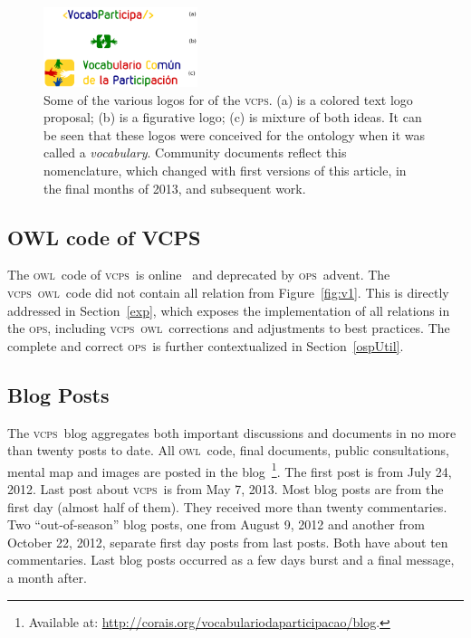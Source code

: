 \documentclass[10pt,letterpaper]{article}
\newcommand{\ops}{\textsc{ops}}
\newcommand{\vcps}{\textsc{vcps}}
\newcommand{\owl}{\textsc{owl}}
\begin{document}
\begin{figure}[!h]
    \centering
    \includegraphics[width=0.4\textwidth]{figs/logoUnificadoDoPDF}
    \caption{Some of the various logos for of the \vcps.
    (a) is a colored text logo proposal; (b) is a figurative logo; (c) is mixture of both ideas.
    It can be seen that these logos were conceived for the ontology when it was called a \emph{vocabulary}.
    Community documents reflect this nomenclature, which changed with first versions of this article,
    in the final months of 2013, and subsequent work.}
    \label{logo}
\end{figure}

\subsection{OWL code of VCPS}\label{owl}
The \owl\ code of \vcps\ is online~\cite{owlVcps} and deprecated by \ops\ advent. 
The \vcps\ \owl\ code did not contain all relation from Figure~\ref{fig:v1}.
This is directly addressed in Section~\ref{exp},
which exposes the implementation of all relations in the \ops,
including \vcps\ \owl\ corrections and adjustments to best practices.
The complete and correct \ops\ is further contextualized in Section~\ref{ospUtil}.

\subsection{Blog Posts}
The \vcps\ blog
aggregates both important discussions and documents in no more than twenty posts to date.
All \owl\ code, final documents, public consultations, mental map and images are posted in the blog~\footnote{Available at: \url{http://corais.org/vocabulariodaparticipacao/blog}.}. 
The first post is from July 24, 2012.
Last post about \vcps\ is from May 7, 2013.
Most blog posts are from the first day (almost half of them).
They received more than twenty commentaries.
Two ``out-of-season'' blog posts, one from August 9, 2012 and another from October 22, 2012,
separate first day posts from last posts.
Both have about ten commentaries.
Last blog posts occurred as a few days burst and a final message, a month after.
\end{document}
